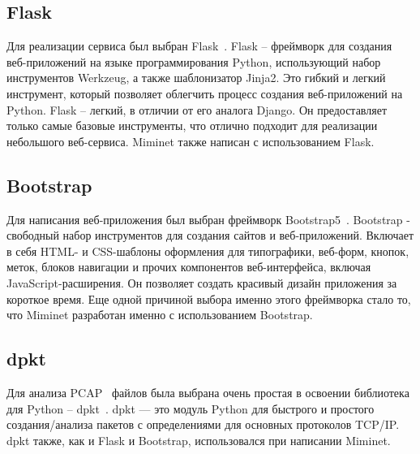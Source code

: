 \subsection{Flask}
Для реализации сервиса был выбран Flask~\cite{Flask}.
Flask -- фреймворк для создания веб-приложений на языке программирования Python, использующий набор инструментов Werkzeug, а также шаблонизатор Jinja2.
Это гибкий и легкий инструмент, который позволяет облегчить процесс создания веб-приложений на Python.
Flask -- легкий, в отличии от его аналога Django. Он предоставляет только самые базовые инструменты,
что отлично подходит для реализации небольшого веб-сервиса. 
Miminet также написан с использованием Flask.


\subsection{Bootstrap}
Для написания веб-приложения был выбран фреймворк Bootstrap5~\cite{Bootstrap}.
Bootstrap - свободный набор инструментов для создания сайтов 
и веб-приложений. Включает в себя HTML- и CSS-шаблоны оформления для типографики, 
веб-форм, кнопок, меток, блоков навигации и прочих компонентов веб-интерфейса, 
включая JavaScript-расширения.
Он позволяет создать красивый дизайн приложения за короткое время. 
Еще одной причиной выбора именно этого фреймворка стало то, что Miminet разработан именно с использованием Bootstrap.


\subsection{dpkt} 
Для анализа PCAP~\cite{PCAP} файлов была выбрана очень простая в освоении библиотека для Python -- dpkt~\cite{dpkt}.
dpkt — это модуль Python для быстрого и простого 
создания/анализа пакетов с определениями для основных 
протоколов TCP/IP.
dpkt также, как и Flask и Bootstrap, использовался при написании Miminet.
